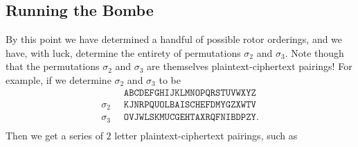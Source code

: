   \subsection{Running the Bombe}
  By this point we have determined a handful of possible rotor
  orderings, and we have, with luck, determine the entirety of
  permutations $\sigma_2$ and $\sigma_3$. Note though that the
  permutations $\sigma_2$ and $\sigma_3$ are themselves
  plaintext-ciphertext pairings! For example, if we determine
  $\sigma_2$ and $\sigma_3$ to be
  \begin{align*}
    & \texttt{ABCDEFGHIJKLMNOPQRSTUVWXYZ} \\
    \sigma_2\;\; & \texttt{KJNRPQUOLBAISCHEFDMYGZXWTV} \\
    \sigma_3\;\; & \texttt{OVJWLSKMUCGEHTAXRQFNIBDPZY}. \\
  \end{align*}
  Then we get a series of $2$ letter plaintext-ciphertext pairings, such as

